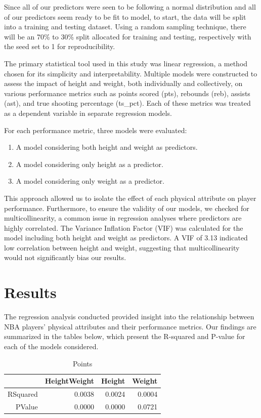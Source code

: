 \documentclass[12pt]{article}
\begin{document}
Since all of our predictors were seen to be following a normal distribution and all of our predictors seem ready to be fit
to model, to start, the data will be split into a training and testing dataset. Using a random sampling technique, there 
will be an 70\% to 30\% split allocated for training and testing, respectively with the seed set to 1 for reproducibility. 

The primary statistical tool used in this study was linear regression, a method chosen for its simplicity and interpretability. 
Multiple models were constructed to assess the impact of height and weight, both individually and collectively, on 
various performance metrics such as points scored (pts), rebounds (reb), assists (ast), and true shooting 
percentage (ts\_pct). Each of these metrics was treated as a dependent variable in separate regression models.

For each performance metric, three models were evaluated:

\begin{enumerate}
    \item A model considering both height and weight as predictors.
    \item A model considering only height as a predictor.
    \item A model considering only weight as a predictor.
\end{enumerate}

This approach allowed us to isolate the effect of each physical attribute on player performance. Furthermore, to 
ensure the validity of our models, we checked for multicollinearity, a common issue in regression analyses where 
predictors are highly correlated. The Variance Inflation Factor (VIF) was calculated for the model including both 
height and weight as predictors. A VIF of 3.13 indicated low correlation between height and weight, suggesting 
that multicollinearity would not significantly bias our results.

\section{Results}
\label{sec:resu}

The regression analysis conducted provided insight into the relationship between NBA players' physical attributes 
and their performance metrics. Our findings are summarized in the tables below, which present the R-squared 
and P-value for each of the models considered.

\begin{table}[h]
\caption{Points}
\label{tab:pts}
\centering
\begin{tabular}{rrrr}
  \hline
 & HeightWeight & Height & Weight \\ 
  \hline
RSquared & 0.0038 & 0.0024 & 0.0004 \\ 
  PValue & 0.0000 & 0.0000 & 0.0721 \\ 
   \hline
\end{tabular}
\end{table}
\end{document}
